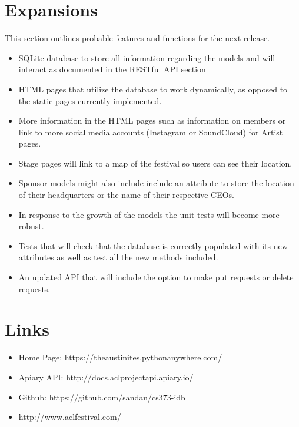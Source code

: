 \documentclass[12pt,english]{scrartcl}
\begin{document}
\section{Expansions}
This section outlines probable features and functions for the next release.
\begin{itemize}
\item SQLite database to store all information regarding the models and will interact as documented in the RESTful API section

\item HTML pages that utilize the database to work dynamically, as opposed to the static pages currently implemented.

\item More information in the HTML pages such as information on members or link to more social media accounts (Instagram or SoundCloud) for Artist pages.

\item Stage pages will link to a map of the festival so users can see their location.

\item Sponsor models might also include include an attribute to store the location of their headquarters or the name of their respective CEOs.

\item In response to the growth of the models the unit tests will become more robust.

\item  Tests that will check that the database is correctly populated with its new attributes as well as test all the new methods included.

\item An updated API that will include the option to make put requests or delete requests.
\end{itemize}

\section{Links}
\begin{itemize}
 \item Home Page: https://theaustinites.pythonanywhere.com/
 \item Apiary API: http://docs.aclprojectapi.apiary.io/
 \item Github: https://github.com/sandan/cs373-idb
 \item http://www.aclfestival.com/
\end{itemize}
\end{document}
